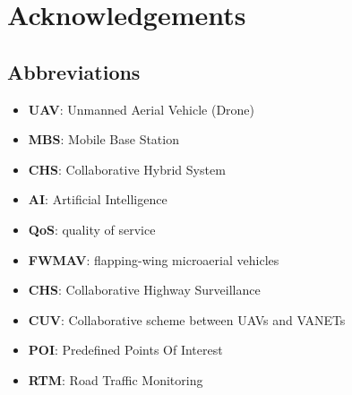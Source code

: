 \chapter*{Acknowledgements}



\section*{Abbreviations}
\begin{itemize}
    \item \textbf{UAV}: Unmanned Aerial Vehicle (Drone)
    \item \textbf{MBS}: Mobile Base Station
    \item \textbf{CHS}: Collaborative Hybrid System
    \item \textbf{AI}: Artificial Intelligence
    \item \textbf{QoS}: quality of service 
    \item \textbf{FWMAV}: flapping-wing microaerial vehicles
    \item \textbf{CHS}: Collaborative Highway Surveillance
    \item \textbf{CUV}: Collaborative scheme between UAVs and VANETs
    \item \textbf{POI}: Predefined Points Of Interest
    \item \textbf{RTM}: Road Traffic Monitoring

    
\end{itemize}